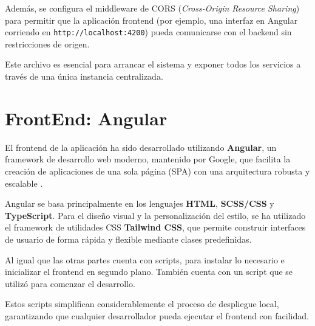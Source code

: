 Además, se configura el middleware de CORS (\textit{Cross-Origin Resource Sharing}) para permitir que la aplicación frontend (por ejemplo, una interfaz en Angular corriendo en \texttt{http://localhost:4200}) pueda comunicarse con el backend sin restricciones de origen.

Este archivo es esencial para arrancar el sistema y exponer todos los servicios a través de una única instancia centralizada.


\newpage

\section{FrontEnd: Angular}

El frontend de la aplicación ha sido desarrollado utilizando \textbf{Angular}, un framework de desarrollo web moderno, mantenido por Google, que facilita la creación de aplicaciones de una sola página (SPA) con una arquitectura robusta y escalable \cite{chiaretta2018front}.

Angular se basa principalmente en los lenguajes \textbf{HTML}, \textbf{SCSS/CSS} y \textbf{TypeScript}. Para el diseño visual y la personalización del estilo, se ha utilizado el framework de utilidades CSS \textbf{Tailwind CSS}, que permite construir interfaces de usuario de forma rápida y flexible mediante clases predefinidas.

Al igual que las otras partes cuenta con scripts, para instalar lo necesario e inicializar el frontend en segundo plano. También cuenta con un script que se utilizó para comenzar el desarrollo.

Estos scripts simplifican considerablemente el proceso de despliegue local, garantizando que cualquier desarrollador pueda ejecutar el frontend con facilidad.

